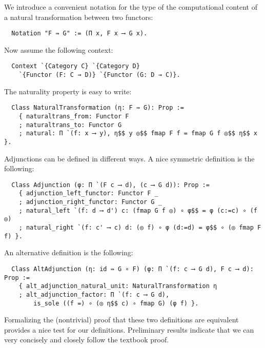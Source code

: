 \documentclass[a4paper,10pt,runningheads]{llncs}
\begin{document}
We introduce a convenient notation for the type of the computational content of a natural transformation between two functors:
\begin{lstlisting}
  Notation "F ⇛ G" := (Π x, F x ⟶ G x).
\end{lstlisting}
Now assume the following context:
\begin{lstlisting}
  Context `{Category C} `{Category D}
    `{Functor (F: C → D)} `{Functor (G: D → C)}.
\end{lstlisting}
The naturality property is easy to write:
\begin{lstlisting}
  Class NaturalTransformation (η: F ⇛ G): Prop :=
    { naturaltrans_from: Functor F
    ; naturaltrans_to: Functor G
    ; natural: Π `(f: x ⟶ y), η$$ y ◎$$ fmap F f = fmap G f ◎$$ η$$ x }.
\end{lstlisting}



Adjunctions can be defined in different ways. A nice symmetric definition is the following:
\begin{lstlisting}
  Class Adjunction (φ: Π `(F c ⟶ d), (c ⟶ G d)): Prop :=
    { adjunction_left_functor: Functor F _
    ; adjunction_right_functor: Functor G _
    ; natural_left `(f: d ⟶ d') c: (fmap G f ◎) ∘ φ$$ = φ (c:=c) ∘ (f ◎)
    ; natural_right `(f: c' ⟶ c) d: (◎ f) ∘ φ (d:=d) = φ$$ ∘ (◎ fmap F f) }.
\end{lstlisting}
An alternative definition is the following:
\begin{lstlisting}
  Class AltAdjunction (η: id ⇛ G ∘ F) (φ: Π `(f: c ⟶ G d), F c ⟶ d): Prop :=
    { alt_adjunction_natural_unit: NaturalTransformation η
    ; alt_adjunction_factor: Π `(f: c ⟶ G d),
        is_sole ((f =) ∘ (◎ η$$ c) ∘ fmap G) (φ f) }.
\end{lstlisting}
Formalizing the (nontrivial) proof that these two definitions are equivalent provides a nice test for our definitions. Preliminary results indicate that we can very concisely and closely follow the textbook proof. %
\end{document}
